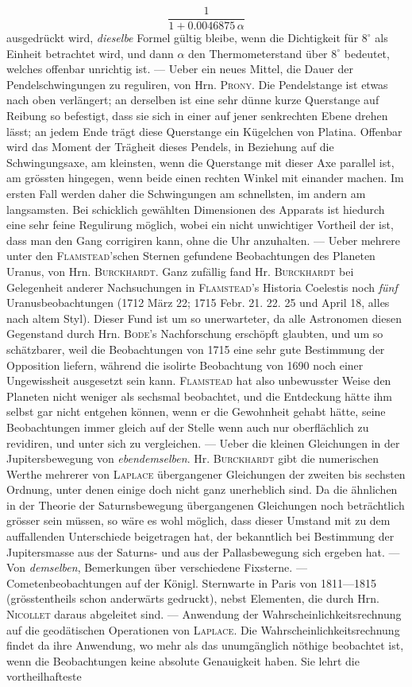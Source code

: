 \[
\frac{1}{1+0.0046875\,\alpha}
\]
 ausgedrückt wird, \emph{dieselbe} Formel gültig bleibe, wenn die Dichtigkeit für $8^\circ$ als Einheit betrachtet wird, und dann $\alpha$ den Thermometerstand über $8^\circ$ bedeutet, welches offenbar unrichtig ist. --- Ueber ein neues Mittel, die Dauer der Pendelschwingungen zu reguliren, von Hrn. \textsc{Prony}. Die Pendelstange ist etwas nach oben verlängert; an derselben ist eine sehr dünne kurze Querstange auf Reibung so befestigt, dass sie sich in einer auf jener senkrechten Ebene drehen lässt; an jedem Ende trägt diese Querstange ein Kügelchen von Platina. Offenbar wird das Moment der Trägheit dieses Pendels, in Beziehung auf die Schwingungsaxe, am kleinsten, wenn die Querstange mit dieser Axe parallel ist, am grössten hingegen, wenn beide einen rechten Winkel mit einander machen. Im ersten Fall werden daher die Schwingungen am schnellsten, im andern am langsamsten. Bei schicklich gewählten Dimensionen des Apparats ist hiedurch eine sehr feine Regulirung möglich, wobei ein nicht unwichtiger Vortheil der ist, dass man den Gang corrigiren kann, ohne die Uhr anzuhalten. --- Ueber mehrere unter den \textsc{Flamstead}'schen Sternen gefundene Beobachtungen des Planeten Uranus, von Hrn. \textsc{Burckhardt}. Ganz zufällig fand Hr. \textsc{Burckhardt} bei Gelegenheit anderer Nachsuchungen in \textsc{Flamstead}'s Historia Coelestis noch \emph{fünf} Uranusbeobachtungen (1712 März 22; 1715 Febr. 21. 22. 25 und April 18, alles nach altem Styl). Dieser Fund ist um so unerwarteter, da alle Astronomen diesen Gegenstand durch Hrn. \textsc{Bode}'s Nachforschung erschöpft glaubten, und um so schätzbarer, weil die Beobachtungen von 1715 eine sehr gute Bestimmung der Opposition liefern, während die isolirte Beobachtung von 1690 noch einer Ungewissheit ausgesetzt sein kann. \textsc{Flamstead} hat also unbewusster Weise den Planeten nicht weniger als sechsmal beobachtet, und die Entdeckung hätte ihm selbst gar nicht entgehen können, wenn er die Gewohnheit gehabt hätte, seine Beobachtungen immer gleich auf der Stelle wenn auch nur oberflächlich zu revidiren, und unter sich zu vergleichen. --- Ueber die kleinen Gleichungen in der Jupitersbewegung von \emph{ebendemselben}. Hr. \textsc{Burckhardt} gibt die numerischen Werthe mehrerer von \textsc{Laplace} übergangener Gleichungen der zweiten bis sechsten Ordnung, unter denen einige doch nicht ganz unerheblich sind. Da die ähnlichen in der Theorie der Saturnsbewegung übergangenen Gleichungen noch beträchtlich grösser sein müssen, so wäre es wohl möglich, dass dieser Umstand mit zu dem auffallenden Unterschiede beigetragen hat, der bekanntlich bei Bestimmung der Jupitersmasse aus der Saturns- und aus der Pallasbewegung sich ergeben hat. --- Von \emph{demselben}, Bemerkungen über verschiedene Fixsterne. --- Cometenbeobachtungen auf der Königl. Sternwarte in Paris von 1811---1815 (grösstentheils schon anderwärts gedruckt), nebst Elementen, die durch Hrn. \textsc{Nicollet} daraus abgeleitet sind. --- Anwendung der Wahrscheinlichkeitsrechnung auf die geodätischen Operationen von \textsc{Laplace}. Die Wahrscheinlichkeitsrechnung findet da ihre Anwendung, wo mehr als das unumgänglich nöthige beobachtet ist, wenn die Beobachtungen keine absolute Genauigkeit haben. Sie lehrt die vortheilhafteste 